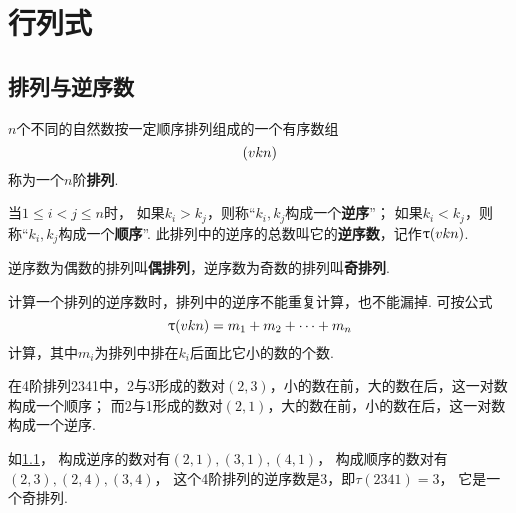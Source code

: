 \chapter{行列式}
\section{排列与逆序数}
\begin{definition}
\(n\)个不同的自然数按一定顺序排列组成的一个有序数组\[
	(v{k}{n})
\]称为一个\(n\)阶\textbf{排列}.

当\(1 \leqslant i<j \leqslant n\)时，
如果\(k_i>k_j\)，则称“\(k_i,k_j\)构成一个\textbf{逆序}”；
如果\(k_i<k_j\)，则称“\(k_i,k_j\)构成一个\textbf{顺序}”.
此排列中的逆序的总数叫它的\textbf{逆序数}，记作\(\uptau(v{k}{n})\).

逆序数为偶数的排列叫\textbf{偶排列}，逆序数为奇数的排列叫\textbf{奇排列}.
\end{definition}

计算一个排列的逆序数时，排列中的逆序不能重复计算，也不能漏掉.
可按公式\[
	\uptau(v{k}{n})=m_1+m_2+\dotsb+m_n
\]计算，其中\(m_i\)为排列中排在\(k_i\)后面比它小的数的个数.
\begin{example}
在4阶排列2341中，2与3形成的数对\((2,3)\)，小的数在前，大的数在后，这一对数构成一个顺序；
而2与1形成的数对\((2,1)\)，大的数在前，小的数在后，这一对数构成一个逆序.

\begin{figure}[ht]
	\centering
	\caption{}
	\label{figure:行列式.4阶排列2341的所有数对}
\end{figure}

如\cref{figure:行列式.4阶排列2341的所有数对}，
构成逆序的数对有\((2,1),(3,1),(4,1)\)，
构成顺序的数对有\((2,3),(2,4),(3,4)\)，
这个4阶排列的逆序数是3，即\(\tau(2341)=3\)，
它是一个奇排列.
\end{example}

